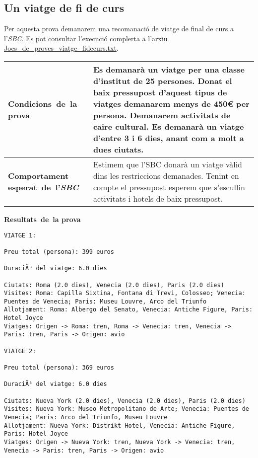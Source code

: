 \documentclass[11pt,a4paper]{article}
\begin{document}
\subsection{Un viatge de fi de curs}
Per aquesta prova demanarem una recomanació de viatge de final de curs a l'\emph{SBC}. Es pot consultar l'execució complerta a l'arxiu \url{Jocs_de_proves_viatge_fidecurs.txt}.\\

\noindent
\begin{tabular}{|p{}|p{}|}
\hline
\textbf{\mbox{Condicions de la} \mbox{prova}} & Es demanarà un viatge per una classe d'institut de 25 persones. Donat el baix pressupost d'aquest tipus de viatges demanarem menys de 450\euro{} per persona. Demanarem activitats de caire cultural. Es demanarà un viatge d'entre 3 i 6 dies, anant com a molt a dues ciutats.\\
\hline
\textbf{Comportament \mbox{esperat de l'\emph{SBC}}} & Estimem que l'SBC donarà un viatge vàlid dins les restriccions demanades. Tenint en compte el pressupost esperem que s'escullin activitats i hotels de baix pressupost. \\
\hline
\end{tabular}
\bigskip
\textbf{\mbox{Resultats de la} \mbox{prova}}\begin{lstlisting}
VIATGE 1:

Preu total (persona): 399 euros

DuraciÃ³ del viatge: 6.0 dies

Ciutats: Roma (2.0 dies), Venecia (2.0 dies), Paris (2.0 dies)
Visites: Roma: Capilla Sixtina, Fontana di Trevi, Colosseo; Venecia: Puentes de Venecia; Paris: Museu Louvre, Arco del Triunfo
Allotjament: Roma: Albergo del Senato, Venecia: Antiche Figure, Paris: Hotel Joyce
Viatges: Origen -> Roma: tren, Roma -> Venecia: tren, Venecia -> Paris: tren, Paris -> Origen: avio

VIATGE 2:

Preu total (persona): 369 euros

DuraciÃ³ del viatge: 6.0 dies

Ciutats: Nueva York (2.0 dies), Venecia (2.0 dies), Paris (2.0 dies)
Visites: Nueva York: Museo Metropolitano de Arte; Venecia: Puentes de Venecia; Paris: Arco del Triunfo, Museu Louvre
Allotjament: Nueva York: Distrikt Hotel, Venecia: Antiche Figure, Paris: Hotel Joyce
Viatges: Origen -> Nueva York: tren, Nueva York -> Venecia: tren, Venecia -> Paris: tren, Paris -> Origen: avio


\end{lstlisting}
\medskip
\end{document}

